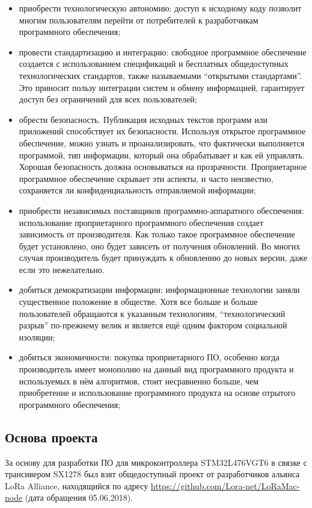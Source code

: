 \begin{itemize}
 \item приобрести технологическую автономию: доступ к исходному коду позволит 
многим пользователям перейти от потребителей к разработчикам программного 
обеспечения;
 \item провести стандартизацию и интеграцию: свободное программное обеспечение 
создается с использованием спецификаций и бесплатных общедоступных 
технологических стандартов, также называемыми ``открытыми стандартами''. Это 
приносит пользу интеграции систем и обмену информацией, гарантирует 
 доступ без ограничений для всех пользователей;
 \item обрести безопасность. Публикация исходных текстов программ или 
приложений способствует их безопасности. Используя открытое программное 
обеспечение, можно узнать и проанализировать, что фактически выполняется 
программой, тип информации, который она обрабатывает и как ей управлять. Хорошая 
безопасность должна основываться на прозрачности. Проприетарное программное 
обеспечение скрывает эти аспекты, и часто неизвестно, сохраняется ли 
конфиденциальность отправляемой информации;
 \item приобрести независимых поставщиков программно-аппаратного обеспечения: 
использование проприетарного программного обеспечения создает зависимость от 
производителя. Как только такое программное обеспечение будет установлено, оно 
будет зависеть от получения обновлений. Во многих случая производитель будет 
принуждать к обновлению до новых версии, даже если это нежелательно.
 \item добиться демократизации информации: информационные технологии заняли 
существенное положение в обществе. Хотя все больше и больше пользователей 
обращаются к указанным технологиям, ``технологический разрыв'' по-прежнему велик 
и является ещё одним фактором социальной изоляции;
 \item добиться экономичности: покупка проприетарного ПО, особенно когда 
производитель имеет монополию на данный вид программного продукта и 
используемых в нём алгоритмов, стоит несравненно больше, чем приобретение и 
использование программного продукта на основе отрытого программного 
обеспечения;
\end{itemize}

\subsection{Основа проекта}

За основу для разработки ПО для микроконтроллера STM32L476VGT6 в связке с 
трансивером SX1278 был взят общедоступный проект от разработчиков альянса LoRa 
Alliance, находящийся по адресу \url{https://github.com/Lora-net/LoRaMac-node} 
(дата обращения 05.06.2018).

